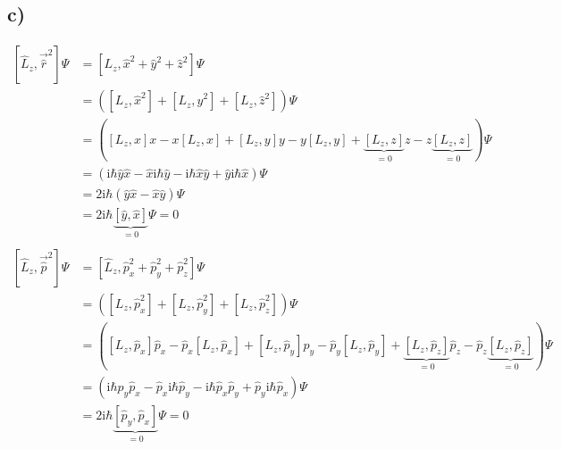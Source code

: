     \subsection{c)}

    \begin{align*}
        \left[ \hat{L}_z,\vec{\hat{r}}^2 \right] \Psi &= [L_z, \hat x ^2 + \hat y ^2 + \hat z ^2] \Psi \\
        &= ([L_z, \hat x ^2 ] + [L_z, \hat y ^2 ] + [L_z, \hat z ^2 ]) \Psi \\
        &= \left( \left[ L_z,x \right]x - x\left[ L_z,x \right] + \left[ L_z,y \right]y - y\left[ L_z,y \right] + \underbrace{\left[ L_z,z \right]}_{=0}z - z\underbrace{\left[ L_z,z \right]}_{=0}\right) \Psi\\
        &= \left( \text{i}\hbar \hat{y}\hat{x} - \hat{x}\text{i}\hbar\hat{y} - \text{i}\hbar \hat{x}\hat{y} + \hat{y}\text{i}\hbar\hat{x} \right) \Psi\\
        &= 2\text{i}\hbar \left( \hat{y}\hat{x}-\hat{x}\hat{y} \right) \Psi\\
        &= 2\text{i}\hbar \underbrace{\left[ \hat{y},\hat{x} \right]}_{=0} \Psi = 0\\
        \\
        \left[ \hat{L}_z,\vec{\hat{p}}^2 \right] \Psi &= [\hat L _z , \hat p _x ^2 + \hat p _y^2 + \hat p _z^2 ] \Psi\\
        &= \left( \left[ L_z,\hat{p}_x ^2 \right] + \left[ L_z,\hat{p}_y ^2 \right] + \left[ L_z,\hat{p}_z ^2 \right] \right)\Psi\\
        &= \left( \left[ L_z,\hat{p}_x \right]\hat{p}_x - \hat{p}_x\left[ L_z,\hat{p}_x \right] + \left[ L_z,\hat{p}_y \right]\hat{p}_y - \hat{p}_y\left[ L_z,\hat{p}_y \right] + \underbrace{\left[ L_z,\hat{p}_z \right]}_{=0}\hat{p}_z - \hat{p}_z\underbrace{\left[ L_z,\hat{p}_z \right]}_{=0}\right) \Psi\\
        &= \left( \text{i}\hbar \hat{p}_y\hat{p}_x - \hat{p}_x\text{i}\hbar\hat{p}_y - \text{i}\hbar \hat{p}_x\hat{p}_y + \hat{p}_y\text{i}\hbar\hat{p}_x \right) \Psi\\
        &= 2\text{i}\hbar \underbrace{\left[ \hat{p}_y,\hat p _x \right]}_{=0} \Psi = 0\\
    \end{align*}

